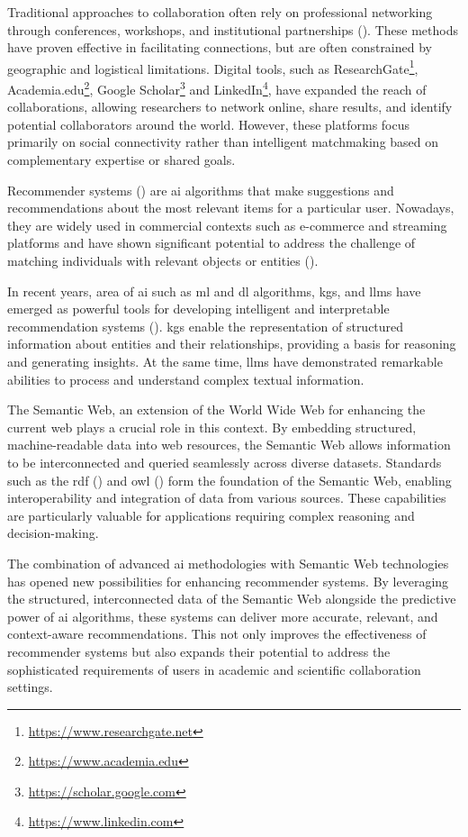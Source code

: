 Traditional approaches to collaboration often rely on professional networking through conferences, workshops, and institutional partnerships (\cite{KATZ19971}).
These methods have proven effective in facilitating connections, but are often constrained by geographic and logistical limitations.
Digital tools, such as ResearchGate\footnote{\url{https://www.researchgate.net}}, Academia.edu\footnote{\url{https://www.academia.edu}}, Google Scholar\footnote{\url{https://scholar.google.com}} and LinkedIn\footnote{\url{https://www.linkedin.com}}, have expanded the reach of collaborations, allowing researchers to network online, share results, and identify potential collaborators around the world.
However, these platforms focus primarily on social connectivity rather than intelligent matchmaking based on complementary expertise or shared goals.

Recommender systems (\cite{Lu2012}) are \gls{ai} algorithms that make suggestions and recommendations about the most relevant items for a particular user.
Nowadays, they are widely used in commercial contexts such as e-commerce and streaming platforms and have shown significant potential to address the challenge of matching individuals with relevant objects or entities (\cite{Hussien2021}).

In recent years, area of \gls{ai} such as \gls{ml} and \gls{dl} algorithms,  \glspl{kg}, and \glspl{llm} have emerged as powerful tools for developing intelligent and interpretable recommendation systems (\cite{Zhao2024}).
\glspl{kg} enable the representation of structured information about entities and their relationships, providing a basis for reasoning and generating insights.
At the same time, \glspl{llm} have demonstrated remarkable abilities to process and understand complex textual information. 

The Semantic Web, an extension of the World Wide Web for enhancing the current web plays a crucial role in this context.
By embedding structured, machine-readable data into web resources, the Semantic Web allows information to be interconnected and queried seamlessly across diverse datasets.
Standards such as the \gls{rdf} (\cite{Cyganiak14RCA}) and \gls{owl} (\cite{Deborah2004}) form the foundation of the Semantic Web, enabling interoperability and integration of data from various sources.
These capabilities are particularly valuable for applications requiring complex reasoning and decision-making.

The combination of advanced \gls{ai} methodologies with Semantic Web technologies has opened new possibilities for enhancing recommender systems.
By leveraging the structured, interconnected data of the Semantic Web alongside the predictive power of \gls{ai} algorithms, these systems can deliver more accurate, relevant, and context-aware recommendations.
This not only improves the effectiveness of recommender systems but also expands their potential to address the sophisticated requirements of users in academic and scientific collaboration settings.
%
